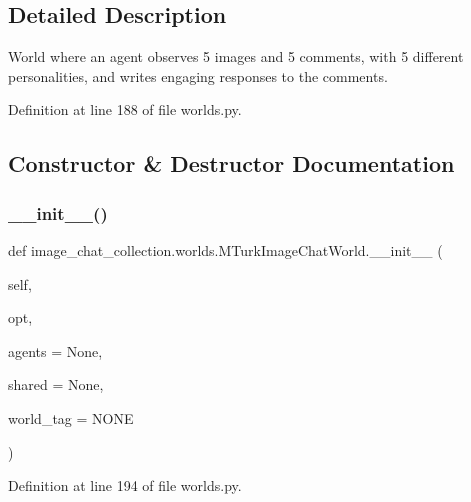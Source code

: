 \subsection{Detailed Description}
\begin{DoxyVerb}World where an agent observes 5 images and 5 comments, with 5 different
personalities, and writes engaging responses to the comments.
\end{DoxyVerb}
 

Definition at line 188 of file worlds.\+py.



\subsection{Constructor \& Destructor Documentation}
\mbox{\label{classimage__chat__collection_1_1worlds_1_1MTurkImageChatWorld_aa4c8a2169f71ac876be070a1c9c5cbdc}} 
\subsubsection{\texorpdfstring{\+\_\+\+\_\+init\+\_\+\+\_\+()}{\_\_init\_\_()}}
{\footnotesize\ttfamily def image\+\_\+chat\+\_\+collection.\+worlds.\+M\+Turk\+Image\+Chat\+World.\+\_\+\+\_\+init\+\_\+\+\_\+ (\begin{DoxyParamCaption}\item[{}]{self,  }\item[{}]{opt,  }\item[{}]{agents = {\ttfamily None},  }\item[{}]{shared = {\ttfamily None},  }\item[{}]{world\+\_\+tag = {\ttfamily \textquotesingle{}NONE\textquotesingle{}} }\end{DoxyParamCaption})}



Definition at line 194 of file worlds.\+py.


